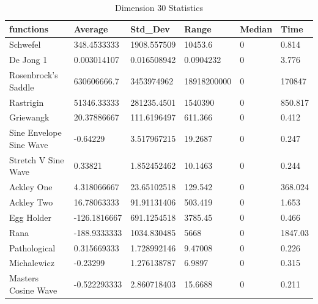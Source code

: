 \documentclass[12pt]{article}
\begin{document}
	\newpage
		\begin{table}[h]
			\centering
			\caption{Dimension 30 Statistics}
			\begin{tabular}{llllll} 
				\hline
				functions               & \textbf{Average} & \textbf{Std\_Dev} & \textbf{Range} & \textbf{Median} & \textbf{Time}  \\ 
				\hline
				Schwefel                & 348.4533333      & 1908.557509       & 10453.6        & 0               & 0.814          \\
				De Jong 1               & 0.003014107      & 0.016508942       & 0.0904232      & 0               & 3.776          \\
				Rosenbrock's Saddle     & 630606666.7      & 3453974962        & 18918200000    & 0               & 170847         \\
				Rastrigin               & 51346.33333      & 281235.4501       & 1540390        & 0               & 850.817        \\
				Griewangk               & 20.37886667      & 111.6196497       & 611.366        & 0               & 0.412          \\
				Sine Envelope Sine Wave & -0.64229         & 3.517967215       & 19.2687        & 0               & 0.247          \\
				Stretch V Sine Wave     & 0.33821          & 1.852452462       & 10.1463        & 0               & 0.244          \\
				Ackley One              & 4.318066667      & 23.65102518       & 129.542        & 0               & 368.024        \\
				Ackley Two              & 16.78063333      & 91.91131406       & 503.419        & 0               & 1.653          \\
				Egg Holder              & -126.1816667     & 691.1254518       & 3785.45        & 0               & 0.466          \\
				Rana                    & -188.9333333     & 1034.830485       & 5668           & 0               & 1847.03        \\
				Pathological            & 0.315669333      & 1.728992146       & 9.47008        & 0               & 0.226          \\
				Michalewicz             & -0.23299         & 1.276138787       & 6.9897         & 0               & 0.315          \\
				Masters Cosine Wave  & -0.522293333     & 2.860718403       & 15.6688        & 0               & 0.211          \\

\end{tabular}
\end{table}
\end{document}
